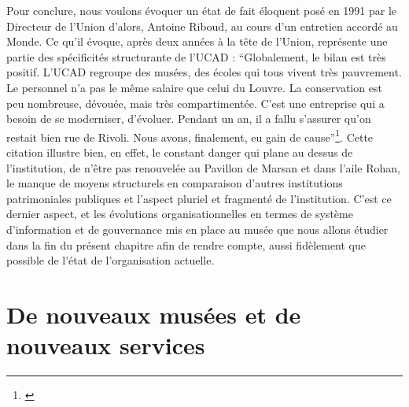 Pour conclure, nous voulons évoquer un état de fait éloquent posé en 1991 par le Directeur de l'Union d'alors, Antoine Riboud, au cours d'un entretien accordé au Monde. Ce qu'il évoque, après deux années à la tête de l'Union, représente une partie des spécificités structurante de l'UCAD : \enquote{Globalement, le bilan est très positif. L'UCAD regroupe des musées, des écoles qui tous vivent très pauvrement. Le personnel n'a pas le même salaire que celui du Louvre. La conservation est peu nombreuse, dévouée, mais très compartimentée. C'est une entreprise qui a besoin de se moderniser, d'évoluer. Pendant un an, il a fallu s'assurer qu'on restait bien rue de Rivoli. Nous avons, finalement, eu gain de cause}\footnote{\cite{noauthor_entretien_1991}}. Cette citation illustre bien, en effet, le constant danger qui plane au dessus de l'institution, de n'être pas renouvelée au Pavillon de Marsan et dans l'aile Rohan, le manque de moyens structurels en comparaison d'autres institutions patrimoniales publiques et l'aspect pluriel et fragmenté de l'institution. C'est ce dernier aspect, et les évolutions organisationnelles en termes de système d'information et de gouvernance mis en place au musée que nous allons étudier dans la fin du présent chapitre afin de rendre compte, aussi fidèlement que possible de l'état de l'organisation actuelle.

\section{De nouveaux musées et de nouveaux services}


